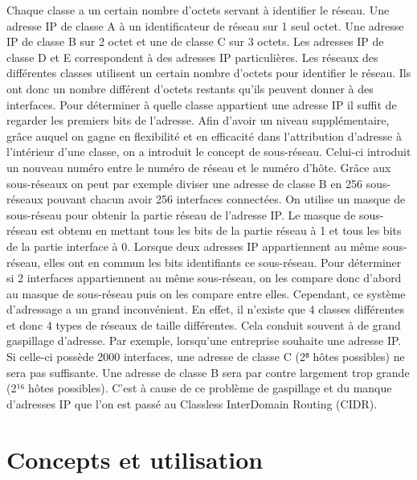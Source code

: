 \documentclass[twoside,openright,a4paper,11pt,french]{article}
\begin{document}
Chaque classe a un certain nombre d'octets servant à identifier le réseau. Une adresse IP de classe A à un identificateur de réseau sur 1 seul octet. Une adresse IP de classe B sur 2 octet et une de classe C sur 3 octets. Les adresses IP de classe D et E correspondent à des adresses IP particulières.
Les réseaux des différentes classes utilisent un certain nombre d'octets pour identifier le réseau. Ils ont donc un nombre différent d'octets restants qu'ils peuvent donner à des interfaces. 
Pour déterminer à quelle classe appartient une adresse IP il suffit de regarder les premiers bits de l'adresse.
Afin d'avoir un niveau supplémentaire, grâce auquel on gagne en flexibilité et en efficacité dans l'attribution d'adresse à l'intérieur d'une classe, on a introduit le concept de sous-réseau. Celui-ci introduit un nouveau numéro entre le numéro de réseau et le numéro d'hôte. Grâce aux sous-réseaux on peut par exemple diviser une adresse de classe B en 256 sous-réseaux pouvant chacun avoir 256 interfaces connectées.
On utilise un masque de sous-réseau pour obtenir la partie réseau de l'adresse IP. Le masque de sous-réseau est obtenu en mettant tous les bits de la partie réseau à 1 et tous les bits de la partie interface à 0. Lorsque deux adresses IP appartiennent au même sous-réseau, elles ont en commun les bits identifiants ce sous-réseau. Pour déterminer si 2 interfaces appartiennent au même sous-réseau, on les compare donc d'abord au masque de sous-réseau puis on les compare entre elles.
Cependant, ce système d'adressage a un grand inconvénient. En effet, il n'existe que 4 classes différentes et donc 4 types de réseaux de taille différentes. Cela conduit souvent à de grand gaspillage d'adresse. Par exemple, lorsqu'une entreprise souhaite une adresse IP. Si celle-ci possède 2000 interfaces, une adresse de classe C (2⁸ hôtes possibles) ne sera pas suffisante. Une adresse de classe B sera par contre largement trop grande (2¹⁶ hôtes possibles). C'est à cause de ce problème de gaspillage et du manque d'adresses IP que l'on est passé au   Classless InterDomain Routing (CIDR).



\section{Concepts et utilisation}






\end{document}
